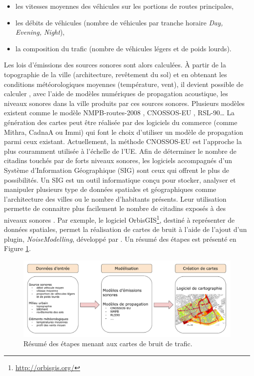 \begin{itemize}
\item les vitesses moyennes des véhicules sur les portions de routes principales,
\item les débits de véhicules (nombre de véhicules par tranche horaire \textit{Day, Evening, Night}),
\item la composition du trafic (nombre de véhicules légers et de poids lourds).\\
\end{itemize}

Les lois d'émissions des sources sonores sont alors calculées. À partir de la topographie de la ville (architecture, revêtement du sol) et en obtenant les conditions météorologiques moyennes (température, vent), il devient possible de calculer , avec l'aide de modèles numériques de propagation acoustique, les niveaux sonores dans la ville produits par ces sources sonores. Plusieurs modèles existent comme le modèle NMPB-routes-2008 \cite{setra_prevision_2009-1, setra_prevision_2009-2},  CNOSSOS-EU \cite{CNOSSOS}, RSL-90\dots{} La génération des cartes peut être réalisée par des logiciels du commerce (comme Mithra, CadnaA ou Immi) qui font le choix d'utiliser un modèle de propagation parmi ceux existant. Actuellement, la méthode CNOSSOS-EU est l'approche la plus couramment utilisée à l'échelle de l'UE. Afin de déterminer le nombre de citadins touchés par de forts niveaux sonores, les logiciels accompagnés d'un Système d'Information Géographique (SIG) sont ceux qui offrent le plus de possibilités. Un SIG est un outil informatique conçu pour stocker, analyser et manipuler plusieurs type de données spatiales et géographiques comme l'architecture des villes ou le nombre d'habitants présents. Leur utilisation permette de connaitre plus facilement le nombre de citadins exposés à des niveaux sonores \cite{murphy2011scenario}. Par exemple, le logiciel OrbisGIS\footnote{\url{http://orbisgis.org/}}, destiné à représenter de données spatiales, permet la réalisation de cartes de bruit à l'aide de l'ajout d'un plugin, \textit{NoiseModelling}, développé par \cite{fortin}. Un résumé des étapes est présenté en Figure \ref{fig:cartographie}.\\

\begin{figure}[t]
\centering
\includegraphics[width=.85\linewidth]{./figures/cartographie/cartographie.pdf}
\caption{Résumé des étapes menant aux cartes de bruit de trafic.}
\label{fig:cartographie}
\end{figure}


